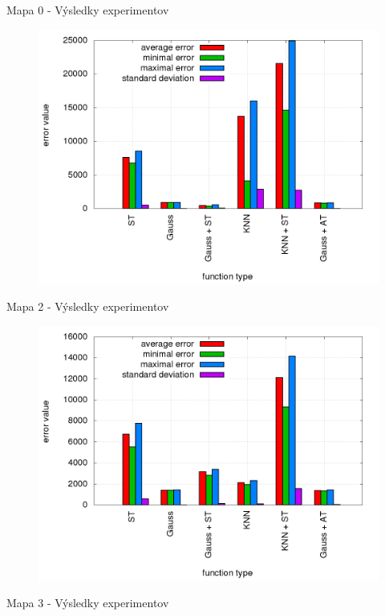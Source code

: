 Mapa 0 - Výsledky experimentov

\begin{figure}[!htb]
\centering
\includegraphics[scale=.4]{../../results_q_learning/map_0/trials_average_results.png}
\end{figure}


Mapa 2 - Výsledky experimentov

\begin{figure}[!htb]
\centering
\includegraphics[scale=.4]{../../results_q_learning/map_2/trials_average_results.png}
\end{figure}


Mapa 3 - Výsledky experimentov

